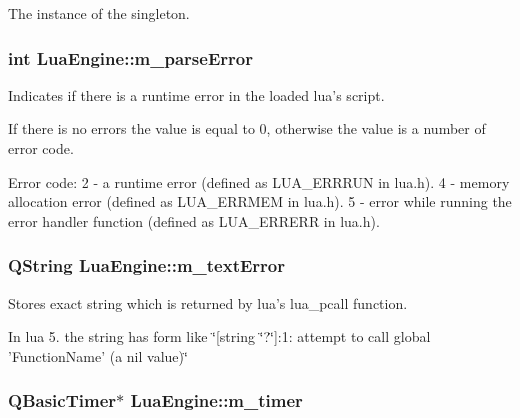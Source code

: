 The instance of the singleton. 

\hypertarget{class_lua_engine_ac7c65e343f73a0dadcbe2d5f1a5842f3}{
\subsubsection[{m\-\_\-parse\-Error}]{\setlength{\rightskip}{0pt plus 5cm}int Lua\-Engine\-::m\-\_\-parse\-Error\hspace{0.3cm}{\ttfamily [private]}}}\label{class_lua_engine_ac7c65e343f73a0dadcbe2d5f1a5842f3}


Indicates if there is a runtime error in the loaded lua's script. 

If there is no errors the value is equal to 0, otherwise the value is a number of error code. \begin{DoxyVerb}            Error code:
            2 - a runtime error (defined as LUA_ERRRUN in lua.h).
            4 - memory allocation error (defined as LUA_ERRMEM in lua.h).
            5 - error while running the error handler function (defined as LUA_ERRERR in lua.h).\end{DoxyVerb}
 \hypertarget{class_lua_engine_a0cb5dc043a3f9b162ad97245cd7e6956}{
\subsubsection[{m\-\_\-text\-Error}]{\setlength{\rightskip}{0pt plus 5cm}Q\-String Lua\-Engine\-::m\-\_\-text\-Error\hspace{0.3cm}{\ttfamily [private]}}}\label{class_lua_engine_a0cb5dc043a3f9b162ad97245cd7e6956}


Stores exact string which is returned by lua's lua\-\_\-pcall function. 

In lua 5. the string has form like \char`\"{}\mbox{[}string \char`\"{}?\char`\"{}\mbox{]}\-:1\-: attempt to call global '\-Function\-Name' (a nil value)\char`\"{} \hypertarget{class_lua_engine_a367284a1461c5a2d2804c3f9b4d94f14}{
\subsubsection[{m\-\_\-timer}]{\setlength{\rightskip}{0pt plus 5cm}Q\-Basic\-Timer$\ast$ Lua\-Engine\-::m\-\_\-timer\hspace{0.3cm}{\ttfamily [private]}}}\label{class_lua_engine_a367284a1461c5a2d2804c3f9b4d94f14}



